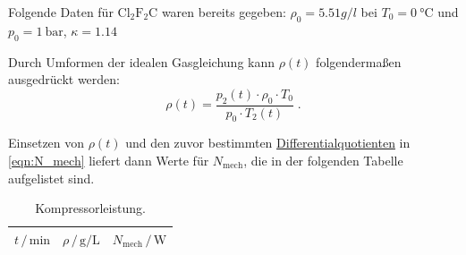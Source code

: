 Folgende Daten für $\mathrm{Cl}_2 \mathrm{F}_2 \mathrm{C}$ waren bereits gegeben:
$ρ_0 = \SI{5.51} g/l$ bei $T_0 = \SI{0}{\celsius}$ und $p_0 = \SI{1}{\bar}$, $κ = 1.14$

Durch Umformen der idealen Gasgleichung kann $\rho(t)$ folgendermaßen ausgedrückt werden:
\begin{equation*}
  \rho(t) = \frac{p_2(t) \cdot \rho_0 \cdot T_0}{p_0 \cdot T_2(t)} \; .
\end{equation*}

Einsetzen von $\rho(t)$ und den zuvor bestimmten \hyperref[tab:derivatives]{Differentialquotienten} in \autoref{eqn:N_mech} liefert dann Werte für $N_\text{mech}$,
die in der folgenden Tabelle aufgelistet sind.

\begin{table}
\centering
\caption{Kompressorleistung.}
\begin{tabular}{c c c}
\toprule
$t \,/\, \si{\minute}$ &
$\rho \,/\, \si{\gram\per\liter}$ &
$N_\text{mech} \,/\, \si{\watt}$ \\
\midrule

\bottomrule
\end{tabular}
\end{table}
